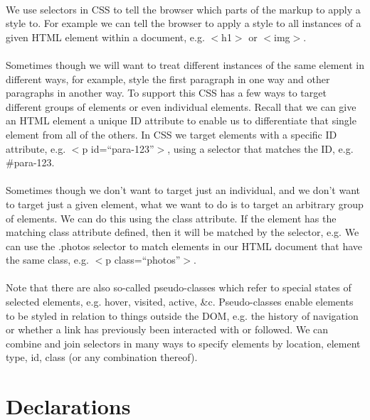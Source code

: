 \paragraph{} We use selectors in CSS to tell the browser which parts of the markup to apply a style to. For example we can tell the browser to apply a style to all instances of a given HTML element within a document, e.g. $<$h1$>$ or $<$img$>$.
\paragraph{} Sometimes though we will want to treat different instances of the same element in different ways, for example, style the first paragraph in one way and other paragraphs in another way. To support this CSS has a few ways to target different groups of elements or even individual elements. Recall that we can give an HTML element a unique ID attribute to enable us to differentiate that single element from all of the others. In CSS we target elements with a specific ID attribute, e.g. $<$p id=``para-123''$>$, using a selector that matches the ID, e.g. \#para-123.
\paragraph{} Sometimes though we don't want to target just an individual, and we don't want to target just a given element, what we want to do is to target an arbitrary group of elements. We can do this using the class attribute. If the element has the matching class attribute defined, then it will be matched by the selector, e.g. We can use the .photos selector to match elements in our HTML document that  have the same class, e.g. $<$p class=``photos''$>$. 
\paragraph{} Note that there are also so-called pseudo-classes which refer to special states of selected elements, e.g. hover, visited, active, \&c. Pseudo-classes enable elements to be styled in relation to things outside the DOM, e.g. the history of navigation or whether a link has previously been interacted with or followed. We can combine and join selectors  in many ways to specify elements by location, element type, id, class (or any combination thereof).



\section{Declarations}
